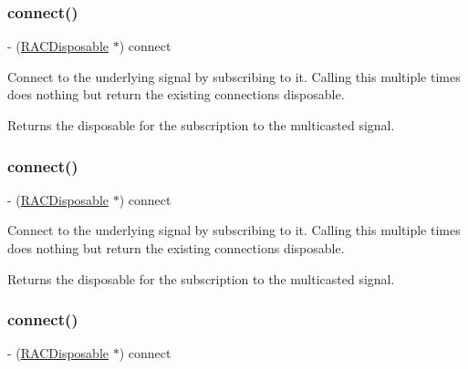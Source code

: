 \subsubsection{\texorpdfstring{connect()}{connect()}\hspace{0.1cm}{\footnotesize\ttfamily [1/3]}}
{\footnotesize\ttfamily -\/ (\mbox{\hyperlink{interface_r_a_c_disposable}{R\+A\+C\+Disposable}} $\ast$) connect \begin{DoxyParamCaption}{ }\end{DoxyParamCaption}}

Connect to the underlying signal by subscribing to it. Calling this multiple times does nothing but return the existing connection\textquotesingle{}s disposable.

Returns the disposable for the subscription to the multicasted signal. \mbox{\label{interface_r_a_c_multicast_connection_a62299415a12cbd53ba5fded7e89584ef}} 
\subsubsection{\texorpdfstring{connect()}{connect()}\hspace{0.1cm}{\footnotesize\ttfamily [2/3]}}
{\footnotesize\ttfamily -\/ (\mbox{\hyperlink{interface_r_a_c_disposable}{R\+A\+C\+Disposable}} $\ast$) connect \begin{DoxyParamCaption}{ }\end{DoxyParamCaption}}

Connect to the underlying signal by subscribing to it. Calling this multiple times does nothing but return the existing connection\textquotesingle{}s disposable.

Returns the disposable for the subscription to the multicasted signal. \mbox{\label{interface_r_a_c_multicast_connection_a62299415a12cbd53ba5fded7e89584ef}} 
\subsubsection{\texorpdfstring{connect()}{connect()}\hspace{0.1cm}{\footnotesize\ttfamily [3/3]}}
{\footnotesize\ttfamily -\/ (\mbox{\hyperlink{interface_r_a_c_disposable}{R\+A\+C\+Disposable}} $\ast$) connect \begin{DoxyParamCaption}{ }\end{DoxyParamCaption}}

